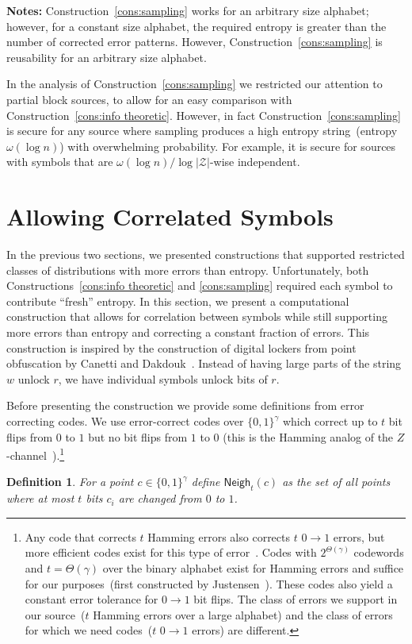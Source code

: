 \documentclass[11pt]{article}
\newcommand{\consref}[1]{\mbox{Construction~\ref{#1}}}
\newcommand{\class}[1]{{\ensuremath{\mathsf{#1}}}}
\newcommand{\zo}{\ensuremath{\{0, 1\}}}
\newcommand{\neigh}{\ensuremath{\class{Neigh}}\xspace}
\newtheorem{definition}[theorem]{Definition}
\begin{document}
\textbf{Notes:} \consref{cons:sampling} works for an arbitrary size alphabet; however, for a constant size alphabet, the required entropy is greater than the number of corrected error patterns.  However, \consref{cons:sampling} is reusability for an arbitrary size alphabet.

In the analysis of \consref{cons:sampling} we restricted our attention to partial block sources, to allow for an easy comparison with \consref{cons:info theoretic}.  However,  in fact \consref{cons:sampling}  is secure for any source where sampling produces a high entropy string~(entropy $\omega(\log n)$) with overwhelming probability. For example, it is secure for sources with symbols that are $\omega(\log n)/\log |\mathcal{Z}|$-wise independent. 


\section{Allowing Correlated Symbols}
\label{sec:cor construction}
In the previous two sections, we presented constructions that supported restricted classes of distributions with more errors than entropy.  Unfortunately, both Constructions~\ref{cons:info theoretic} and \ref{cons:sampling} required each symbol to contribute ``fresh'' entropy.  In this section, we present a computational construction that allows for correlation between symbols while still supporting more errors than entropy and correcting a constant fraction of errors.
This construction is inspired by the construction of digital lockers from point obfuscation by Canetti and Dakdouk~\cite{canetti2008obfuscating}.  Instead of having large parts of the string $w$ unlock $r$, we have individual symbols unlock bits of $r$.  

Before presenting the construction we provide some definitions from error correcting codes.
We use error-correct codes over $\{0,1\}^\gamma$ which correct up to $t$ bit flips from $0$ to $1$ but no bit flips from $1$ to $0$ (this is the Hamming analog of the $Z$-channel~\cite{tallini2002capacity}).\footnote{Any code that corrects $t$ Hamming errors also corrects $t$ $0\rightarrow 1$ errors, but more efficient codes  exist for this type of error~\cite{tallini2002capacity}.
Codes with $2^{\Theta(\gamma)}$ codewords and $t = \Theta(\gamma)$ over the binary alphabet exist for Hamming errors and suffice for our purposes~(first constructed by Justensen~\cite{justesen1972class}).  These codes also yield a constant error tolerance for $0\rightarrow 1$ bit flips.
The class of errors we support in our source~($t$ Hamming errors over a large alphabet) and the class of errors for which we need codes~($t$ $0\rightarrow 1$ errors) are different.
}
\begin{definition}
\label{def:hamming z channel}
For a point $c\in \zo^\gamma$ define $\neigh_t(c) $ as the set of all points where at most $t$ bits $c_i$ are changed from $0$ to $1$.
\end{definition}
\end{document}
